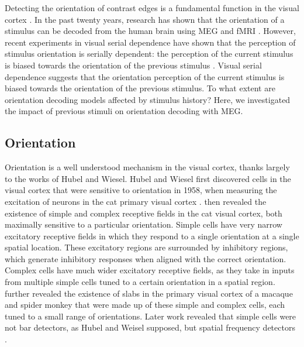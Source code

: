 \documentclass[../main.tex]{subfiles}
\begin{document}
Detecting the orientation of contrast edges is a fundamental function in the visual cortex \citep{hubel_wiesel_1959, hubel_wiesel_1968}. In the past twenty years, research has shown that the orientation of a stimulus can be decoded from the human brain using MEG and fMRI \citep{haynes_rees_2005, kamitani_tong_2005, mannion_mcdonald_clifford_2009, cichy_ramirez_pantazis_2015}. However, recent experiments in visual serial dependence have shown that the perception of stimulus orientation is serially dependent: the perception of the current stimulus is biased towards the orientation of the previous stimulus \citep{fischer_whitney_2014}. Visual serial dependence suggests that the orientation perception of the current stimulus is biased towards the orientation of the previous stimulus. To what extent are orientation decoding models affected by stimulus history? Here, we investigated the impact of previous stimuli on orientation decoding with MEG.

\subsection*{Orientation}
Orientation is a well understood mechanism in the visual cortex, thanks largely to the works of Hubel and Wiesel. Hubel and Wiesel first discovered cells in the visual cortex that were sensitive to orientation in 1958, when measuring the excitation of neurons in the cat primary visual cortex \citep{hubel_wiesel_1959}. \cite{hubel_wiesel_1962} then revealed the existence of simple and complex receptive fields in the cat visual cortex, both maximally sensitive to a particular orientation. Simple cells have very narrow excitatory receptive fields in which they respond to a single orientation at a single spatial location. These excitatory regions are surrounded by inhibitory regions, which generate inhibitory responses when aligned with the correct orientation. Complex cells have much wider excitatory receptive fields, as they take in inputs from multiple simple cells tuned to a certain orientation in a spatial region. \cite{hubel_wiesel_1968} further revealed the existence of slabs in the primary visual cortex of a macaque and spider monkey that were made up of these simple and complex cells, each tuned to a small range of orientations. Later work revealed that simple cells were not bar detectors, as Hubel and Weisel supposed, but spatial frequency detectors \citep{DEVALOIS1982545, devalois_1978}. 
\end{document}
